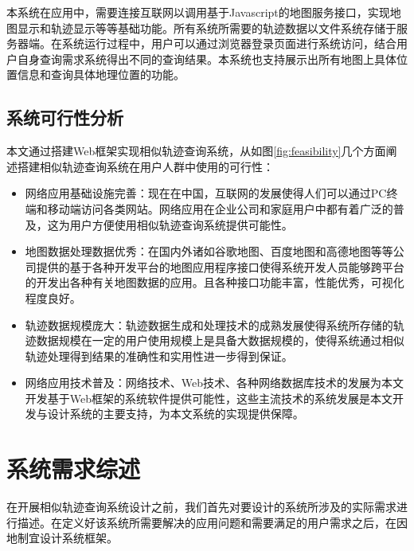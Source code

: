 本系统在应用中，需要连接互联网以调用基于Javascript的地图服务接口，实现地图显示和轨迹显示等等基础功能。所有系统所需要的轨迹数据以文件系统存储于服务器端。在系统运行过程中，用户可以通过浏览器登录页面进行系统访问，结合用户自身查询需求系统得出不同的查询结果。本系统也支持展示出所有地图上具体位置信息和查询具体地理位置的功能。

\subsection{系统可行性分析}
\label{subsec:system feasibility}
本文通过搭建Web框架实现相似轨迹查询系统，从如图\ref{fig:feasibility}几个方面阐述搭建相似轨迹查询系统在用户人群中使用的可行性：
\begin{itemize}
	\item 网络应用基础设施完善：现在在中国，互联网的发展使得人们可以通过PC终端和移动端访问各类网站。网络应用在企业公司和家庭用户中都有着广泛的普及，这为用户方便使用相似轨迹查询系统提供可能性。
	\item 地图数据处理数据优秀：在国内外诸如谷歌地图、百度地图和高德地图等等公司提供的基于各种开发平台的地图应用程序接口使得系统开发人员能够跨平台的开发出各种有关地图数据的应用。且各种接口功能丰富，性能优秀，可视化程度良好。
	\item 轨迹数据规模庞大：轨迹数据生成和处理技术的成熟发展使得系统所存储的轨迹数据规模在一定的用户使用规模上是具备大数据规模的，使得系统通过相似轨迹处理得到结果的准确性和实用性进一步得到保证。
	\item 网络应用技术普及：网络技术、Web技术、各种网络数据库技术的发展为本文开发基于Web框架的系统软件提供可能性，这些主流技术的系统发展是本文开发与设计系统的主要支持，为本文系统的实现提供保障。
\end{itemize}

\vspace{3mm}

\begin{figure}[!htp]
    \centering
    \resizebox{!}{!}{}
\end{figure}

\section{系统需求综述}
\label{sec:overall description}
在开展相似轨迹查询系统设计之前，我们首先对要设计的系统所涉及的实际需求进行描述。在定义好该系统所需要解决的应用问题和需要满足的用户需求之后，在因地制宜设计系统框架。

